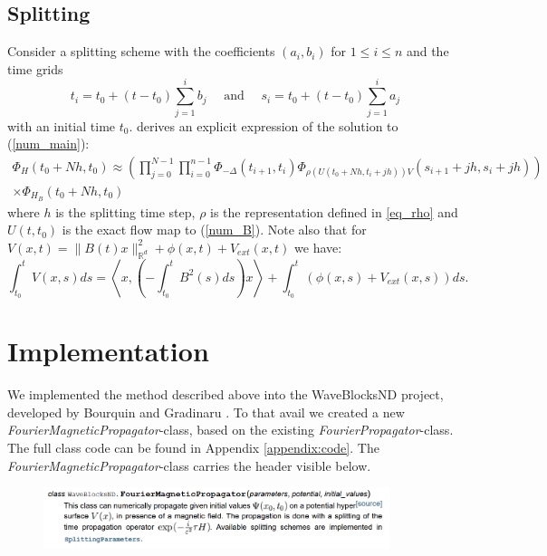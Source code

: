 \documentclass[11pt, a4paper, oneside]{article}
\begin{document}
\subsection{Splitting}
Consider a splitting scheme with the coefficients $(a_i, b_i)$ for $1 \leq i \leq n$ and the time grids
\begin{equation*}
  t_{i}=t_{0}+\left(t-t_{0}\right) \sum_{j=1}^{i} b_{j} \quad \text { and } \quad s_{i}=t_{0}+\left(t-t_{0}\right) \sum_{j=1}^{i} a_{j}
\end{equation*}
with an initial time $t_0$.  derives an explicit expression of the solution to (\ref{num_main}):
\begin{multline} \label{eq:timesteps}
  \Phi_{H}\left(t_{0}+N h, t_{0}\right) \approx \left(\prod_{j=0}^{N-1} \prod_{i=0}^{n-1} \Phi_{-\Delta}\left(t_{i+1}, t_{i}\right) \Phi_{\rho\left(U\left(t_{0}+N h, t_{i}+j h\right)\right) V}\left(s_{i+1}+j h, s_{i}+j h\right)\right) \\ \times \Phi_{H_{B}}\left(t_{0}+N h, t_{0}\right)
\end{multline}
where $h$ is the splitting time step, $\rho$ is the representation defined in \cref{eq_rho} and $U(t, t_0)$ is the exact flow map to (\ref{num_B}). \newline
Note also that for $V(x, t) = \lVert{B(t)x}\rVert_{\mathbb{R}^d}^2 + \phi(x,t) + V_{ext}(x,t)$ we have:
\begin{equation} \label{eq:rotinv}
  \int_{t_0}^t V(x, s) ds = \left\langle x, \left( -\int _{t_0}^t B^2(s)ds\right)x \right\rangle + \int _{t_0}^t \left( \phi(x, s) + V_{ext}(x, s)  \right) ds.
\end{equation}


\section{Implementation}
We implemented the method described above into the WaveBlocksND project, developed by Bourquin and Gradinaru . To that avail we created a new \emph{FourierMagneticPropagator}-class, based on the existing \emph{FourierPropagator}-class. The full class code can be found in Appendix \ref{appendix:code}.
The \emph{FourierMagneticPropagator}-class carries the header visible below.
\begin{figure}[h]
  \centering
  \includegraphics[width = 0.9\textwidth]{graphics/doc_fmp.PNG}
\end{figure}
\end{document}
